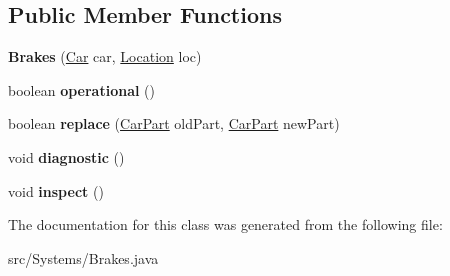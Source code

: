 \subsection*{Public Member Functions}
\begin{DoxyCompactItemize}
\item 
\hypertarget{classSystems_1_1Brakes_a0417265a254fd287d788b9283f927107}{}{\bfseries Brakes} (\hyperlink{classCars_1_1Car}{Car} car, \hyperlink{enumEnums_1_1Location}{Location} loc)\label{classSystems_1_1Brakes_a0417265a254fd287d788b9283f927107}

\item 
\hypertarget{classSystems_1_1Brakes_a531718d8d1891c18076562bb8e959062}{}boolean {\bfseries operational} ()\label{classSystems_1_1Brakes_a531718d8d1891c18076562bb8e959062}

\item 
\hypertarget{classSystems_1_1Brakes_ab614f7ed7a5ea64ecd07f5a76aeda828}{}boolean {\bfseries replace} (\hyperlink{classCars_1_1CarPart}{Car\+Part} old\+Part, \hyperlink{classCars_1_1CarPart}{Car\+Part} new\+Part)\label{classSystems_1_1Brakes_ab614f7ed7a5ea64ecd07f5a76aeda828}

\item 
\hypertarget{classSystems_1_1Brakes_a9655e179ebec461790cc5567ce48e30d}{}void {\bfseries diagnostic} ()\label{classSystems_1_1Brakes_a9655e179ebec461790cc5567ce48e30d}

\item 
\hypertarget{classSystems_1_1Brakes_ae03579bf1c3bb2ca0d1efde46dd5d7a4}{}void {\bfseries inspect} ()\label{classSystems_1_1Brakes_ae03579bf1c3bb2ca0d1efde46dd5d7a4}

\end{DoxyCompactItemize}


The documentation for this class was generated from the following file\+:\begin{DoxyCompactItemize}
\item 
src/\+Systems/Brakes.\+java\end{DoxyCompactItemize}
